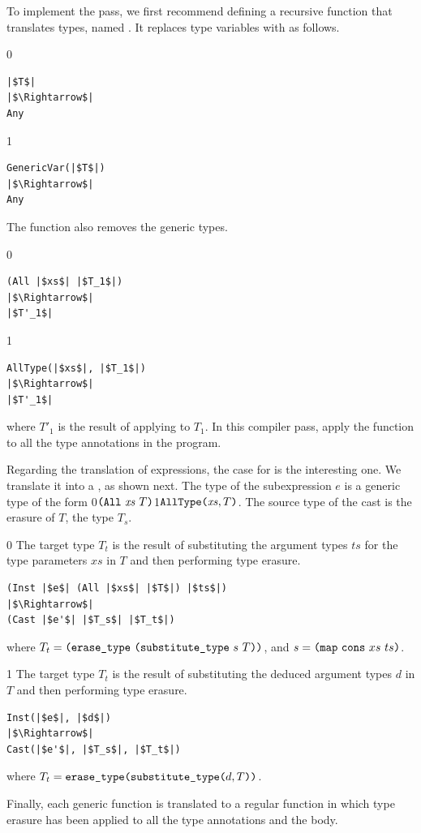 \documentclass[7x10]{TimesAPriori_MIT}%
\def\racketEd{0}
\def\pythonEd{1}
\def\edition{1}
\newcommand{\racket}[1]{{\if\edition\racketEd{#1}\fi}}
\newcommand{\pythonColor}[0]{}
\newcommand{\python}[1]{{\if\edition\pythonEd\pythonColor #1\fi}}
\numberwithin{theorem}{chapter}
\numberwithin{definition}{chapter}
\numberwithin{equation}{chapter}
\begin{document}
To implement the  pass, we first recommend defining
a recursive function that translates types, named
. It replaces type variables with \CANYTY{} as
follows.
%
{\if\edition\racketEd
\begin{lstlisting}
|$T$|
|$\Rightarrow$|
Any
\end{lstlisting}
\fi}
{\if\edition\pythonEd\pythonColor
\begin{lstlisting}
GenericVar(|$T$|)
|$\Rightarrow$|
Any
\end{lstlisting}
\fi}
%
\noindent The  function also removes the generic
 types.
%
{\if\edition\racketEd
\begin{lstlisting}
(All |$xs$| |$T_1$|)
|$\Rightarrow$|
|$T'_1$|
\end{lstlisting}
\fi}
{\if\edition\pythonEd\pythonColor
\begin{lstlisting}
AllType(|$xs$|, |$T_1$|)
|$\Rightarrow$|
|$T'_1$|
\end{lstlisting}
\fi}
\noindent where $T'_1$ is the result of applying  to
$T_1$.
%
In this compiler pass, apply the  function to all 
the type annotations in the program.

Regarding the translation of expressions, the case for  is
the interesting one. We translate it into a , as shown
next.
The type of the subexpression $e$ is a generic type of the form
\racket{$\texttt{(}\texttt{All}~\mathit{xs}~T\texttt{)}$}\python{$\texttt{AllType}\texttt{(}\mathit{xs}, T\texttt{)}$}.
The source type of the cast is the erasure of $T$, the type $T_s$.
%
{\if\edition\racketEd
%
The target type $T_t$ is the result of substituting the argument types
$ts$ for the type parameters $xs$ in $T$ and then performing type
erasure.
%
\begin{lstlisting}
(Inst |$e$| (All |$xs$| |$T$|) |$ts$|)
|$\Rightarrow$|
(Cast |$e'$| |$T_s$| |$T_t$|)
\end{lstlisting}
%
where $T_t = \texttt{(}\texttt{erase\_type}~\texttt{(}\texttt{substitute\_type}~s~T\texttt{)}\texttt{)}$,
and $s = \texttt{(}\texttt{map}~\texttt{cons}~xs~ts\texttt{)}$.
\fi}
{\if\edition\pythonEd\pythonColor
%
The target type $T_t$ is the result of substituting the deduced
argument types $d$ in $T$ and then performing type erasure.
%
\begin{lstlisting}
Inst(|$e$|, |$d$|)
|$\Rightarrow$|
Cast(|$e'$|, |$T_s$|, |$T_t$|)
\end{lstlisting}
%
where
$T_t = \texttt{erase\_type}\texttt{(}\texttt{substitute\_type}\texttt{(} d, T\texttt{)}\texttt{)}$.
\fi}

Finally, each generic function is translated to a regular
function in which type erasure has been applied to all the type
annotations and the body.
\end{document}
